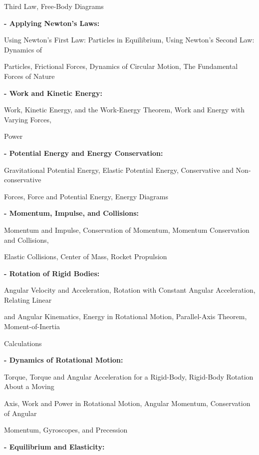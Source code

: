 \documentclass[12pt,a4paper]{article}
\begin{document}
Third Law, Free-Body Diagrams\par
\vspace{2pt}\textbf{- Applying Newton’s Laws:}\par
Using Newton’s First Law: Particles in Equilibrium, Using Newton’s Second Law: Dynamics of\par
Particles, Frictional Forces, Dynamics of Circular Motion, The Fundamental Forces of Nature\par
\vspace{2pt}\textbf{- Work and Kinetic Energy:}\par
Work, Kinetic Energy, and the Work-Energy Theorem, Work and Energy with Varying Forces,\par
Power\par
\vspace{2pt}\textbf{- Potential Energy and Energy Conservation:}\par
Gravitational Potential Energy, Elastic Potential Energy, Conservative and Non-conservative\par
Forces, Force and Potential Energy, Energy Diagrams\par
\vspace{2pt}\textbf{- Momentum, Impulse, and Collisions:}\par
Momentum and Impulse, Conservation of Momentum, Momentum Conservation and Collisions,\par
Elastic Collisions, Center of Mass, Rocket Propulsion\par
\vspace{2pt}\textbf{- Rotation of Rigid Bodies:}\par
Angular Velocity and Acceleration, Rotation with Constant Angular Acceleration, Relating Linear\par
and Angular Kinematics, Energy in Rotational Motion, Parallel-Axis Theorem, Moment-of-Inertia\par
Calculations\par
\vspace{2pt}\textbf{- Dynamics of Rotational Motion:}\par
Torque, Torque and Angular Acceleration for a Rigid-Body, Rigid-Body Rotation About a Moving\par
Axis, Work and Power in Rotational Motion, Angular Momentum, Conservation of Angular\par
Momentum, Gyroscopes, and Precession\par
\vspace{2pt}\textbf{- Equilibrium and Elasticity:}\par
\end{document}
